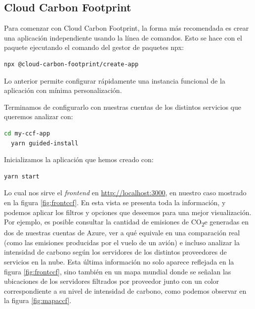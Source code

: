 \documentclass[12pt,a4paper]{report}
\begin{document}
\subsection{Cloud Carbon Footprint}
Para comenzar con Cloud Carbon Footprint, la forma más recomendada es crear una
aplicación independiente usando la línea de comandos. Esto se hace con el
paquete ejecutando el comando del gestor de paquetes npx:

\begin{tcolorbox}[colback=codebackground, colframe=codeborder, boxrule=0.8pt, arc=0mm, boxsep=5pt, left=5pt, right=5pt, top=5pt, bottom=5pt]
  \begin{lstlisting}[language=bash]
  npx @cloud-carbon-footprint/create-app
  \end{lstlisting}
\end{tcolorbox}

Lo anterior permite configurar rápidamente una instancia funcional de la
aplicación con mínima personalización.

Terminamos de configurarlo con nuestras cuentas de los distintos servicios que
queremos analizar con:

\begin{tcolorbox}[colback=codebackground, colframe=codeborder, boxrule=0.8pt, arc=0mm, boxsep=5pt, left=5pt, right=5pt, top=5pt, bottom=5pt]
  \begin{lstlisting}[language=bash]
  cd my-ccf-app
  yarn guided-install
  \end{lstlisting}
\end{tcolorbox}

Inicializamos la aplicación que hemos creado con:

\begin{tcolorbox}[colback=codebackground, colframe=codeborder, boxrule=0.8pt, arc=0mm, boxsep=5pt, left=5pt, right=5pt, top=5pt, bottom=5pt]
  \begin{lstlisting}[language=bash]
  yarn start
  \end{lstlisting}
\end{tcolorbox}

Lo cual nos sirve el \textit{frontend} en
\href{http://localhost:3000}{http://localhost:3000}, en nuestro caso mostrado en la figura \ref{fig:frontccf}.
En esta vista se presenta toda la información, y podemos aplicar los filtros y opciones que deseemos para una mejor visualización. Por ejemplo, es posible consultar la cantidad de emisiones de CO\textsubscript{2}e generadas en dos de nuestras cuentas de Azure, ver a qué equivale en una comparación real (como las emisiones producidas por el vuelo de un avión) e incluso analizar la intensidad de carbono según los servidores de los distintos proveedores de servicios en la nube.
Esta última información no solo aparece reflejada en la figura \ref{fig:frontccf}, sino también en un mapa mundial donde se señalan las ubicaciones de los servidores filtrados por proveedor junto con un color correspondiente a su nivel de intensidad de carbono, como podemos observar en la figura \ref{fig:mapaccf}.
\end{document}
